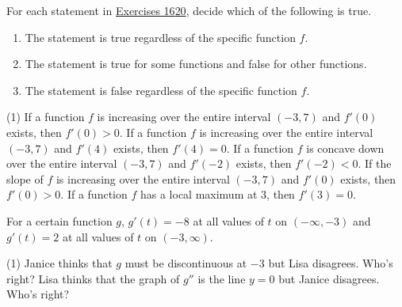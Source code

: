 \documentclass[10pt,oneside,]{book}
\newcommand{\lt}{<}
\newcommand{\gt}{>}
\theoremstyle{plain}
\theoremstyle{definition}
\numberwithin{equation}{section}
\newcommand{\fe}[2]{#1\mathopen{}\left(#2\right)\mathclose{}}
\newcommand{\ointerval}[2]{\left(#1,#2\right)}
\newcommand{\fd}[1]{#1'}
\newcommand{\sd}[1]{#1''}
\begin{document}
\hypertarget{exercisegroup-66}{\null}For each statement in \hyperlink{exercise-function-statement-first}{Exercises 16}\textendash{}\hyperlink{exercise-function-statement-last}{20}, decide which of the following is true. %
\begin{multicols}{3}
\begin{enumerate}[label=(\alph*)]
\item{}The statement is true regardless of the specific function \(f\).\item{}The statement is true for some functions and false for other functions. \item{}The statement is false regardless of the specific function \(f\).\end{enumerate}
\end{multicols}
\par
\begin{exercisegroup}(1)
\exercise[16.]\hypertarget{exercise-function-statement-first}{\null}If a function \(f\) is increasing over the entire interval \(\ointerval{-3}{7}\) and \(\fe{\fd{f}}{0}\) exists, then \(\fe{\fd{f}}{0}\gt0\).%
\exercise[17.]\hypertarget{exercise-314}{\null}If a function \(f\) is increasing over the entire interval \(\ointerval{-3}{7}\) and \(\fe{\fd{f}}{4}\) exists, then \(\fe{\fd{f}}{4}=0\).%
\exercise[18.]\hypertarget{exercise-315}{\null}If a function \(f\) is concave down over the entire interval \(\ointerval{-3}{7}\) and \(\fe{\fd{f}}{-2}\) exists, then \(\fe{\fd{f}}{-2}\lt0\).%
\exercise[19.]\hypertarget{exercise-316}{\null}If the slope of \(f\) is increasing over the entire interval \(\ointerval{-3}{7}\) and \(\fe{\fd{f}}{0}\) exists, then \(\fe{\fd{f}}{0}\gt0\).%
\exercise[20.]\hypertarget{exercise-function-statement-last}{\null}If a function \(f\) has a local maximum at \(3\), then \(\fe{\fd{f}}{3}=0\).%
\end{exercisegroup}
\par\smallskip\noindent
\hypertarget{exercisegroup-67}{\null}For a certain function \(g\), \(\fe{\fd{g}}{t}=-8\) at all values of \(t\) on \(\ointerval{-\infty}{-3}\) and \(\fe{\fd{g}}{t}=2\) at all values of \(t\) on \(\ointerval{-3}{\infty}\).%
\par
\begin{exercisegroup}(1)
\exercise[21.]\hypertarget{exercise-318}{\null}Janice thinks that \(g\) must be discontinuous at \(-3\) but Lisa disagrees.  Who's right?%
\exercise[22.]\hypertarget{exercise-319}{\null}Lisa thinks that the graph of \(\sd{g}\) is the line \(y=0\) but Janice disagrees.  Who's right?%
\end{exercisegroup}
\end{document}
